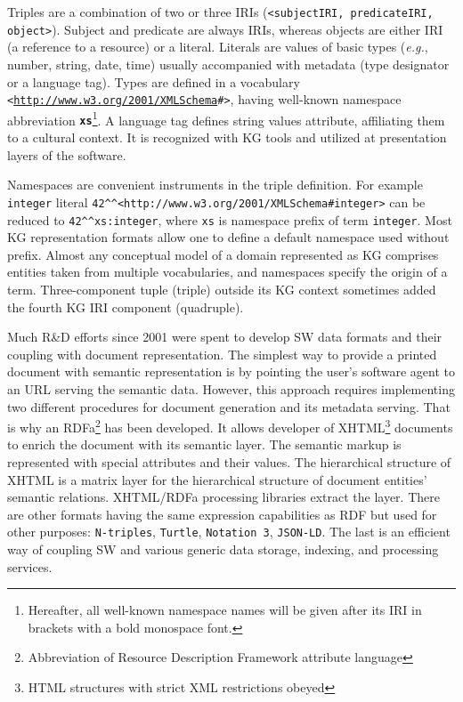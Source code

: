 \documentclass[
]{ceurart}
\newcommand{\ns}[1]{\textbf{\texttt{#1}}}
\begin{document}
Triples are a combination of two or three IRIs (\texttt{<subjectIRI, predicateIRI, object>}).  Subject and predicate are always IRIs, whereas objects are either IRI (a reference to a resource) or a literal.  Literals are values of basic types (\emph{e.g.}, number, string, date, time) usually accompanied with metadata (type designator or a language tag).  Types are defined in a vocabulary \texttt{<\url{http://www.w3.org/2001/XMLSchema}\#>}, having well-known namespace abbreviation \ns{xs}\footnote{Hereafter, all well-known namespace names will be given after its IRI in brackets with a bold monospace font.}.  A language tag defines string values attribute, affiliating them to a cultural context.  It is recognized with KG tools and utilized at presentation layers of the software.

Namespaces are convenient instruments in the triple definition.  For example \verb|integer| literal \verb|42^^<http://www.w3.org/2001/XMLSchema#integer>| can be reduced to \verb|42^^xs:integer|, where \verb|xs| is namespace prefix of term \verb|integer|.  Most KG representation formats allow one to define a default namespace used without prefix.  Almost any conceptual model of a domain represented as KG comprises entities taken from multiple vocabularies, and namespaces specify the origin of a term.  Three-component tuple (triple) outside its KG context sometimes added the fourth KG IRI component (quadruple).

Much R\&D efforts since 2001 \cite{tbl} were spent to develop SW data formats and their coupling with document representation.  The simplest way to provide a printed document with semantic representation is by pointing the user's software agent to an URL serving the semantic data.  However, this approach requires implementing two different procedures for document generation and its metadata serving.  That is why an RDFa\footnote{Abbreviation of Resource Description Framework attribute language} has been developed.  It allows developer of XHTML\footnote{HTML structures with strict XML restrictions obeyed} documents to enrich the document with its semantic layer.  The semantic markup is represented with special attributes and their values.  The hierarchical structure of XHTML is a matrix layer for the hierarchical structure of document entities' semantic relations.  XHTML/RDFa processing libraries extract the layer.  There are other formats having the same expression capabilities as RDF but used for other purposes: \texttt{N-triples}, \texttt{Turtle}, \texttt{Notation~3}, \texttt{JSON-LD}.  The last is an efficient way of coupling SW and various generic data storage, indexing, and processing services.
\end{document}
